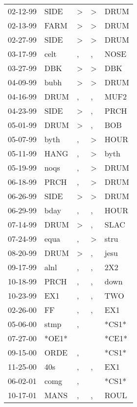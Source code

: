 \begin{supertabular}{lllll}
 02-12-99 &   SIDE &  \textgreater &  \textgreater &   DRUM \\
 02-13-99 &   FARM &  \textgreater &  \textgreater &   DRUM \\
 02-27-99 &   SIDE &  \textgreater &  \textgreater &   DRUM \\
 03-17-99 &   celt &             , &             , &   NOSE \\
 03-27-99 &    DBK &  \textgreater &  \textgreater &    DBK \\
 04-09-99 &   bubh &  \textgreater &  \textgreater &   DRUM \\
 04-16-99 &   DRUM &             , &             , &   MUF2 \\
 04-23-99 &   SIDE &  \textgreater &             , &   PRCH \\
 05-01-99 &   DRUM &  \textgreater &             , &    BOB \\
 05-07-99 &   byth &             , &  \textgreater &   HOUR \\
 05-11-99 &   HANG &             , &  \textgreater &   byth \\
 05-19-99 &   noqs &             , &  \textgreater &   DRUM \\
 06-18-99 &   PRCH &             , &  \textgreater &   DRUM \\
 06-26-99 &   SIDE &  \textgreater &  \textgreater &   DRUM \\
 06-29-99 &   bday &             , &             , &   HOUR \\
 07-14-99 &   DRUM &  \textgreater &             , &   SLAC \\
 07-24-99 &   equa &             , &  \textgreater &   stru \\
 08-20-99 &   DRUM &  \textgreater &             , &   jesu \\
 09-17-99 &   alnl &             , &             , &    2X2 \\
 10-18-99 &   PRCH &             , &             , &   down \\
 10-23-99 &    EX1 &             , &             , &    TWO \\
 02-26-00 &     FF &             , &             , &    EX1 \\
 05-06-00 &   stmp &             , &               &  *CS1* \\
 07-27-00 &  *OE1* &               &               &  *CE1* \\
 09-15-00 &   ORDE &             , &               &  *CS1* \\
 11-25-00 &    40s &             , &             , &    EX1 \\
 06-02-01 &   comg &             , &               &  *CS1* \\
 10-17-01 &   MANS &             , &             , &   ROUL \\
\end{supertabular}
